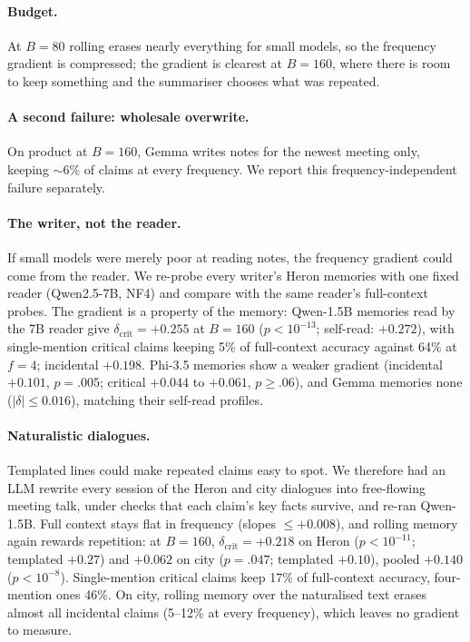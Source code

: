 \paragraph{Budget.}
At $B{=}80$ rolling erases nearly everything for small models, so the frequency gradient is compressed; the gradient is clearest at $B{=}160$, where there is room to keep something and the summariser chooses what was repeated.

\paragraph{A second failure: wholesale overwrite.}
On product at $B{=}160$, Gemma writes notes for the newest meeting only, keeping ${\sim}6\%$ of claims at every frequency. We report this frequency-independent failure separately.

\paragraph{The writer, not the reader.}
If small models were merely poor at reading notes, the frequency gradient could come from the reader.
We re-probe every writer's Heron memories with one fixed reader (Qwen2.5-7B, NF4) and compare with the same reader's full-context probes.
The gradient is a property of the memory: Qwen-1.5B memories read by the 7B reader give $\delta_{\text{crit}}=+0.255$ at $B{=}160$ ($p<10^{-13}$; self-read: $+0.272$), with single-mention critical claims keeping 5\% of full-context accuracy against 64\% at $f{=}4$; incidental $+0.198$.
Phi-3.5 memories show a weaker gradient (incidental $+0.101$, $p=.005$; critical $+0.044$ to $+0.061$, $p\ge.06$), and Gemma memories none ($|\delta|\le0.016$), matching their self-read profiles.

\paragraph{Naturalistic dialogues.}
Templated lines could make repeated claims easy to spot.
We therefore had an LLM rewrite every session of the Heron and city dialogues into free-flowing meeting talk, under checks that each claim's key facts survive, and re-ran Qwen-1.5B.
Full context stays flat in frequency (slopes $\le+0.008$), and rolling memory again rewards repetition: at $B{=}160$, $\delta_{\text{crit}}=+0.218$ on Heron ($p<10^{-11}$; templated $+0.27$) and $+0.062$ on city ($p=.047$; templated $+0.10$), pooled $+0.140$ ($p<10^{-8}$).
Single-mention critical claims keep 17\% of full-context accuracy, four-mention ones 46\%.
On city, rolling memory over the naturalised text erases almost all incidental claims (5--12\% at every frequency), which leaves no gradient to measure.


